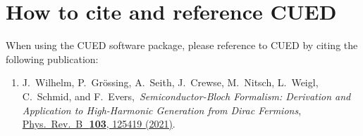\documentclass[11pt, a4paper]{scrartcl}
\newcommand{\paper}[4]{\item #1, \,\textit{#2}, \,\href{#3}{#4}.\\[-1.4em]}
\begin{document}
\section{How to cite and reference CUED}
When using the CUED software package, please reference to CUED by citing the following publication:
\begin{enumerate}[leftmargin=*]

\paper{J.~Wilhelm, P.~Grössing, A.~Seith, J.~Crewse, M.~Nitsch, L.~Weigl, C.~Schmid, and F.~Evers}{Semi\-con\-duc\-tor-Bloch Formalism: Derivation and Application to High-Harmonic Generation from Dirac Fermions}{https://doi.org/10.1103/PhysRevB.103.125419}{ 
Phys.~Rev.~B~\,\textbf{103}, 125419 (2021)}
\label{Wilhelm2021}

\end{enumerate}
\end{document}
